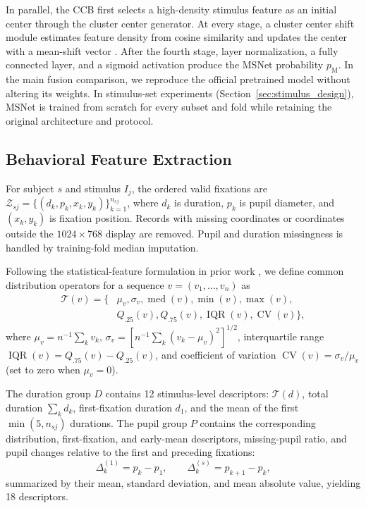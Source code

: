\documentclass[conference,a4paper]{IEEEtran}
\begin{document}
In parallel, the CCB first selects a high-density stimulus feature as an initial center through the cluster center generator. At every stage, a cluster center shift module estimates feature density from cosine similarity and updates the center with a mean-shift vector \cite{song2024ems}. After the fourth stage, layer normalization, a fully connected layer, and a sigmoid activation produce the MSNet probability $p_{\mathrm{M}}$. In the main fusion comparison, we reproduce the official pretrained model without altering its weights. In stimulus-set experiments (Section~\ref{sec:stimulus_design}), MSNet is trained from scratch for every subset and fold while retaining the original architecture and protocol.

\subsection{Behavioral Feature Extraction}
For subject $s$ and stimulus $I_j$, the ordered valid fixations are $\mathcal{Z}_{sj}=\{(d_k,p_k,x_k,y_k)\}_{k=1}^{n_{sj}}$, where $d_k$ is duration, $p_k$ is pupil diameter, and $(x_k,y_k)$ is fixation position. Records with missing coordinates or coordinates outside the $1024\times768$ display are removed. Pupil and duration missingness is handled by training-fold median imputation.

Following the statistical-feature formulation in prior work \cite{vu2026comparative}, we define common distribution operators for a sequence $v=(v_1,\ldots,v_n)$ as
\begin{equation}
\begin{aligned}
\mathcal{T}(v)=\{&\mu_v,\sigma_v,\operatorname{med}(v),\min(v),\max(v),\\
&Q_{.25}(v),Q_{.75}(v),\operatorname{IQR}(v),\operatorname{CV}(v)\},
\end{aligned}
\label{eq:distribution_features}
\end{equation}
where $\mu_v=n^{-1}\sum_k v_k$, $\sigma_v=[n^{-1}\sum_k(v_k-\mu_v)^2]^{1/2}$, interquartile range $\operatorname{IQR}(v)=Q_{.75}(v)-Q_{.25}(v)$, and coefficient of variation $\operatorname{CV}(v)=\sigma_v/\mu_v$ (set to zero when $\mu_v=0$).

The duration group $D$ contains 12 stimulus-level descriptors: $\mathcal{T}(d)$, total duration $\sum_k d_k$, first-fixation duration $d_1$, and the mean of the first $\min(5,n_{sj})$ durations. The pupil group $P$ contains the corresponding distribution, first-fixation, and early-mean descriptors, missing-pupil ratio, and pupil changes relative to the first and preceding fixations:
\begin{equation}
\Delta_k^{(1)}=p_k-p_1,\qquad \Delta_k^{(s)}=p_{k+1}-p_k,
\label{eq:pupil_changes}
\end{equation}
summarized by their mean, standard deviation, and mean absolute value, yielding 18 descriptors.
\end{document}
